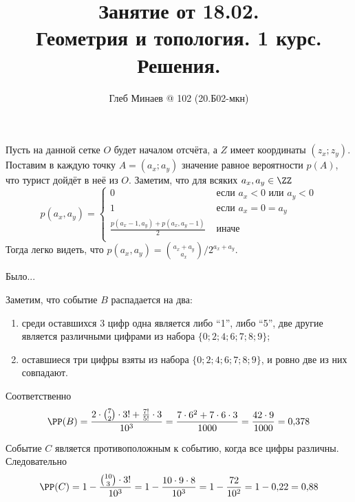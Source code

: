 \documentclass[12pt,a4paper]{article}
\title{Занятие от 18.02.\\Геометрия и топология. 1 курс.\\Решения.}
\author{Глеб Минаев @ 102 (20.Б02-мкн)}
\begin{document}
    \maketitle

    \begin{problem}{16}
        Пусть на данной сетке $O$ будет началом отсчёта, а $Z$ имеет координаты $(z_x; z_y)$. Поставим в каждую точку $A = (a_x; a_y)$ значение равное вероятности $p(A)$, что турист дойдёт в неё из $O$. Заметим, что для всяких $a_x, a_y \in \ZZ$
        \[
            p(a_x, a_y) = 
            \begin{cases}
                0& \text{ если $a_x < 0$ или $a_y < 0$}\\
                1& \text{ если $a_x = 0 = a_y$}\\
                \frac{p(a_x - 1, a_y) + p(a_x, a_y - 1)}{2}& \text{ иначе}\\
            \end{cases}
        \]
        Тогда легко видеть, что $p(a_x, a_y) = \binom{a_x + a_y}{a_x} / 2^{a_x + a_y}$.
    \end{problem}

    \begin{problem}{17}
        Было...
    \end{problem}

    \begin{problem}{21}
        Заметим, что событие $B$ распадается на два:
        \begin{enumerate}
            \item среди оставшихся 3 цифр одна является либо ``1'', либо ``5'', две другие является различными цифрами из набора $\{0; 2; 4; 6; 7; 8; 9\}$;
            \item оставшиеся три цифры взяты из набора $\{0; 2; 4; 6; 7; 8; 9\}$, и ровно две из них совпадают.
        \end{enumerate}
        Соответственно
        \[
            \PP(B)
            = \frac{2 \cdot \binom{7}{2} \cdot 3! + \frac{7!}{5!} \cdot 3}{10^3}
            = \frac{7 \cdot 6^2 + 7 \cdot 6 \cdot 3}{1000}
            = \frac{42 \cdot 9}{1000}
            = 0{,}378
        \]

        Событие $C$ является противоположным к событию, когда все цифры различны. Следовательно
        \[
            \PP(C)
            = 1 - \frac{\binom{10}{3} \cdot 3!}{10^3}
            = 1 - \frac{10 \cdot 9 \cdot 8}{10^3}
            = 1 - \frac{72}{10^2}
            = 1 - 0{,}22
            = 0{,}88
        \]
    \end{problem}
\end{document}
